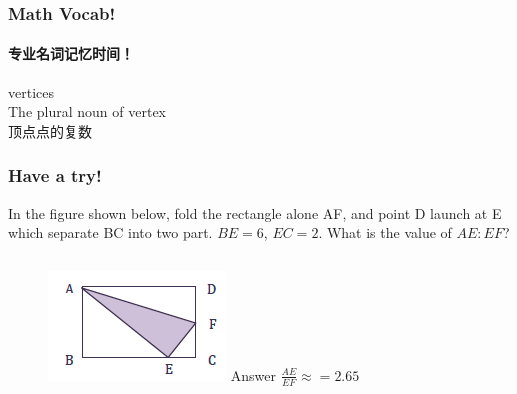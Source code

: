 \documentclass[
	11pt, %
]{beamer}
\begin{document}

\begin{frame}
	\frametitle{Math Vocab!} %
	\framesubtitle{专业名词记忆时间！}
	
	{\Huge vertices}\\

		\bigskip\bigskip
	{\LARGE The plural noun of vertex \\ 
	顶点点的复数}

\end{frame}



\begin{frame}
	\frametitle{Have a try!}

In the figure shown below, fold the rectangle alone AF, and point D launch at E
which separate BC into two part. $BE = 6$, $EC = 2$. What is the value of $AE : EF$?\\ 
	\begin{columns}[t] 
		\begin{column}{0.3\textwidth} %

		\begin{figure}
			\includegraphics[width=\linewidth]{Similar_Triangle_Example_Question1.png}
			\pause
			Answer \textbf{$\frac{AE}{EF}\approx=2.65$}
		\end{figure}	
		\end{column}


\end{columns}
\end{frame}
\end{document}
